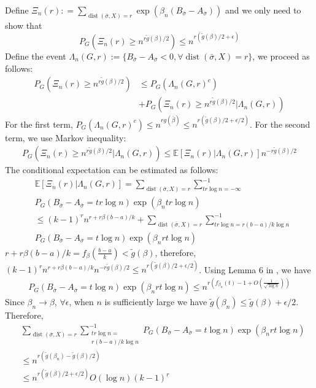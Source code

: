 \documentclass[journal]{IEEEtran}
\DeclareMathOperator{\dist}{dist}
\begin{document}
Define $\Xi_n(r): = \sum_{\dist(\bar{\sigma}, X)=r}\exp(\beta_n(B_{\bar{\sigma}}-A_{\bar{\sigma}}))$ and we only need to show that
\begin{equation}
P_{G}(\Xi_n(r) \geq n^{r \tilde{g}(\beta) /2}) \leq  n^{r (\tilde{g}(\beta) /2 + \epsilon)}
\end{equation}
Define the event $\Lambda_n(G,r):=\{B_{\bar{\sigma}} -A_{\bar{\sigma}} < 0, \forall \dist(\bar{\sigma}, X)=r\}$,
we proceed as follows:
\begin{align*}
P_{G}(\Xi_n(r) \geq n^{r \tilde{g}(\beta) /2}) &\leq
P_G(\Lambda_n(G,r)^c) \\
&+ P_G(\Xi_n(r) \geq n^{r \tilde{g}(\beta) /2} |\Lambda_n(G,r) )
\end{align*}
For the first term, 
$P_G(\Lambda_n(G,r)^c) \leq n^{rg(\bar{\beta})} \leq n^{r (\tilde{g}(\beta) /2 + \epsilon/2)}$.
For the second term, we use Markov inequality:
\begin{align*}
P_G(\Xi_n(r) \geq n^{r \tilde{g}(\beta) /2} |\Lambda_n(G,r) )
\leq \mathbb{E}[\Xi_n(r)|\Lambda_n(G,r)]n^{-r \tilde{g}(\beta) /2} 
\end{align*}
The conditional expectation can be estimated as follows:
\begin{align*}
&\mathbb{E}[\Xi_n(r)|\Lambda_n(G,r)]=
\sum_{\dist(\bar{\sigma}, X) = r}\sum_{tr\log n = -\infty }^{-1} \\
& P_G(B_{\bar{\sigma}} -A_{\bar{\sigma}}=tr\log n)\exp(\beta_n tr \log n) \\
& \leq (k-1)^r n^{r+r\beta(b-a)/k} +
\sum_{\dist(\bar{\sigma}, X) = r}\sum_{tr\log n = r(b-a)/k\log n }^{-1} \\
& P_G(B_{\bar{\sigma}} -A_{\bar{\sigma}}=t\log n)\exp(\beta_n rt \log n)
\end{align*}
$r+r\beta(b-a)/k = f_{\beta}(\frac{b-a}{k}) < \tilde{g}(\beta)$, therefore,
$(k-1)^r n^{r+r\beta(b-a)/k}n^{-r \tilde{g}(\beta) /2} \leq n^{r (\tilde{g}(\beta) /2 + \epsilon/2)} $.
Using Lemma 6 in \cite{sibmmc}, we have
\begin{align*}
P_G(B_{\bar{\sigma}} -A_{\bar{\sigma}}=t\log n)\exp(\beta_n rt \log n) \leq 
n^{r(f_{\beta_n}(t)-1 + O(\frac{1}{\sqrt{\log n}}))}
\end{align*}
Since $\beta_n \to \beta$, $\forall \epsilon$, when $n$ is sufficiently large
we have $\tilde{g}(\beta_n) \leq \tilde{g}(\beta) + \epsilon /2$.
Therefore,
\begin{align*}
&\sum_{\dist(\bar{\sigma}, X) = r}\sum_{\substack{tr\log n = \\ r(b-a)/k\log n} }^{-1}
P_G(B_{\bar{\sigma}} -A_{\bar{\sigma}}=t\log n)\exp(\beta_n rt \log n) \\
& \leq  n^{r(\tilde{g}(\beta_n) - \tilde{g}(\beta)/2)}\\
& \leq  n^{r(\tilde{g}(\beta)/2 + \epsilon/2)} O(\log n) (k-1)^r
\end{align*}
\end{document}
